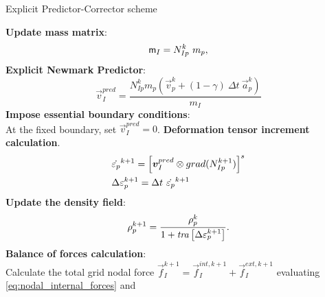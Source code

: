 \begin{algorithm}
  \label{alg:PCE-algorithm}
  \renewcommand{\thealgorithm}{}
  \caption{Explicit Predictor-Corrector scheme}
  \begin{algorithmic}[1]
    \STATE \textbf{Update mass matrix}:
    \begin{equation*}
      \mathsf{m}_{I} = N_{Ip}^{k}\ m_p,
    \end{equation*}
    \STATE \textbf{Explicit Newmark Predictor}:\\
    \begin{equation*}
      \vec{v}_I^{pred} = \frac{ N_{Ip}^{k} m_p (\vec{v}_p^k + (1 - \gamma)\ \Delta t\ \vec{a}_p^k)}{m_I}
    \end{equation*}
    \STATE \textbf{Impose essential boundary conditions}:\\
    At the fixed boundary, set $\vec{v}_{I}^{pred} = 0$. 
    \STATE \textbf{Deformation tensor increment calculation}.
    \begin{align*}
      &\dot{\tens{\varepsilon}_{p}}^{k+1} = \left[ \vec{v}_{I}^{pred} \otimes
        \Grad{N_{Ip}^{k+1}} \right]^s \\
      &\Delta \tens{\varepsilon}_{p}^{k+1} = \Delta t\ \dot{\tens{\varepsilon}_{p}}^{k+1}
    \end{align*}
    \STATE \textbf{Update the density field}:
    \begin{equation*}
      \rho_p^{k+1} = \frac{\rho_p^k}{1 + \mathit{tra}\left[\Delta\mathsf{\varepsilon}_{p}^{k+1}\right]}.
    \end{equation*}
    \STATE \textbf{Balance of forces calculation}:\\
    Calculate the total grid nodal force $\vec{f}_{I}^{k+1} =
    \vec{f}_{I}^{int,k+1} + \vec{f}_{I}^{ext,k+1}$ evaluating
    \eqref{eq:nodal_internal_forces} and

\end{algorithmic}
\end{algorithm}
